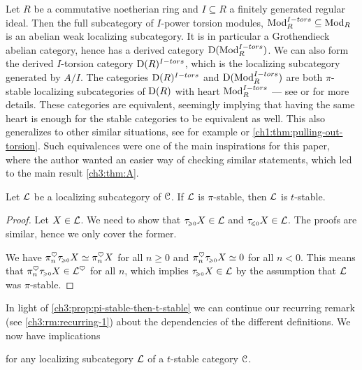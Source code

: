 \begin{example}
    \label{ch3:ex:abelian-torsion}
    Let $R$ be a commutative noetherian ring and $I\subseteq R$ a finitely generated regular ideal. Then the full subcategory of $I$-power torsion modules, $\mathrm{Mod}_R^{I-tors}\subseteq \mathrm{Mod}_R$ is an abelian weak localizing subcategory. It is in particular a Grothendieck abelian category, hence has a derived category $\mathrm{D}(\mathrm{Mod}_R^{I-tors})$. We can also form the derived $I$-torsion category $\mathrm{D}(R)^{I-tors}$, which is the localizing subcategory generated by $A/I$. The categories $\mathrm{D}(R)^{I-tors}$ and $\mathrm{D}(\mathrm{Mod}_R^{I-tors})$ are both $\pi$-stable localizing subcategories of $\mathrm{D}(R)$ with heart $\mathrm{Mod}_R^{I-tors}$ --- see \cite{greenlees-may_92} or \cite{barthel-heard-valenzuela_2018} for more details. These categories are equivalent, seemingly implying that having the same heart is enough for the stable categories to be equivalent as well. This also generalizes to other similar situations, see for example \cite[3.15, 3.17]{barthel-heard-valenzuela_2020} or \cref{ch1:thm:pulling-out-torsion}. Such equivalences were one of the main inspirations for this paper, where the author wanted an easier way of checking similar statements, which led to the main result \cref{ch3:thm:A}. 
\end{example}

\begin{proposition}
    \label{ch3:prop:pi-stable-then-t-stable}
    Let $\mathcal{L}$ be a localizing subcategory of $\EuScript{C}$. If $\mathcal{L}$ is $\pi$-stable, then $\mathcal{L}$ is $t$-stable. 
\end{proposition}
\begin{proof}
    Let $X\in \mathcal{L}$. We need to show that $\tau_{\hspace{-1pt}\scriptscriptstyle\geqslant 0} X\in \mathcal{L}$ and $\tau_{\hspace{-1pt}\scriptscriptstyle\leqslant 0} X\in \mathcal{L}$. The proofs are similar, hence we only cover the former. 
    
    We have $\pi_n^\heartsuit \tau_{\hspace{-1pt}\scriptscriptstyle\geqslant 0} X \simeq \pi_n^\heartsuit X$ for all $n\geq 0$ and $\pi_n^\heartsuit \tau_{\hspace{-1pt}\scriptscriptstyle\geqslant 0} X\simeq 0$ for all $n<0$. This means that $\pi_n^\heartsuit \tau_{\hspace{-1pt}\scriptscriptstyle\geqslant 0} X \in \mathcal{L}^\heartsuit$ for all $n$, which implies $\tau_{\hspace{-1pt}\scriptscriptstyle\geqslant 0} X \in \mathcal{L}$ by the assumption that $\mathcal{L}$ was $\pi$-stable. 
\end{proof}

\begin{remark}
    \label{ch3:rm:recurring-2}
    In light of \cref{ch3:prop:pi-stable-then-t-stable} we can continue our recurring remark (see \cref{ch3:rm:recurring-1}) about the dependencies of the different definitions. We now have implications
    \begin{center}
    \end{center}
    for any localizing subcategory $\mathcal{L}$ of a $t$-stable category $\EuScript{C}$. 
\end{remark}


